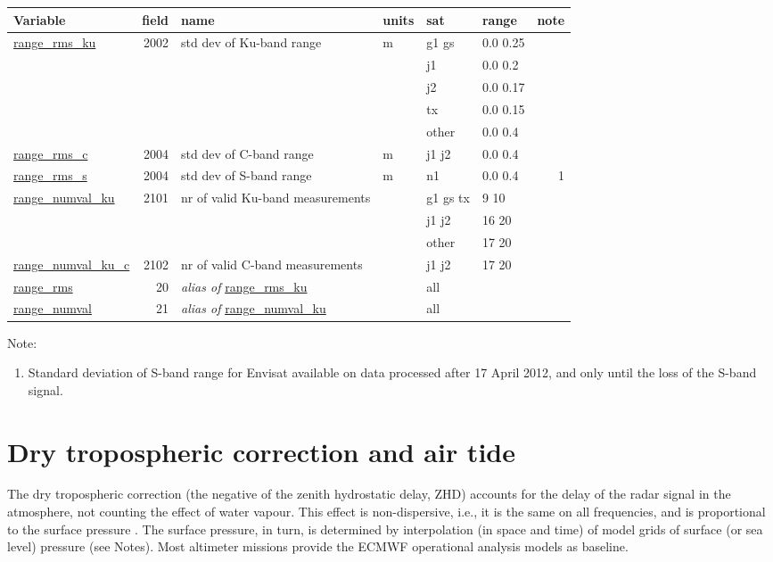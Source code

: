 \documentclass[a4paper,11pt,openany,natbib]{thesis}
\makeatletter
\newcommand\var[1]{\url{#1}\index{variables!#1@\protect\url{#1}}}
\newcommand\alias[1]{\emph{alias of} \var{#1}}
\newenvironment{vartable}{
\begin{table}[ht]
\small
\begin{tabular}{lrllllr}
\hline
Variable & field & name & units & sat & range & note \\
\hline
}{
\hline
\end{tabular}
\end{table}
}
\makeatother
\begin{document}
\begin{vartable}
\var{range_rms_ku} & 2002 & std dev of Ku-band range & m & g1 gs & 0.0 0.25 & \\
                    &      &                          &   & j1 & 0.0 0.2 & \\
                    &      &                          &   & j2 & 0.0 0.17 & \\
                    &      &                          &   & tx & 0.0 0.15 & \\
                    &      &                          &   & other & 0.0 0.4 & \\
\var{range_rms_c}  & 2004 & std dev of C-band range  & m & j1 j2 & 0.0 0.4 & \\
\var{range_rms_s}  & 2004 & std dev of S-band range  & m & n1 & 0.0 0.4 & 1 \\
\var{range_numval_ku} & 2101 & nr of valid Ku-band measurements && g1 gs tx & 9 10 & \\
                      &      &                                      && j1 j2 & 16 20 & \\
                      &      &                                      && other & 17 20 & \\
\var{range_numval_ku_c} & 2102 & nr of valid C-band measurements && j1 j2 & 17 20 & \\
\hline
\var{range_rms}    &   20 & \alias{range_rms_ku} && all && \\
\var{range_numval} &   21 & \alias{range_numval_ku} && all && \\
\end{vartable}

Note:
\begin{enumerate}
\item Standard deviation of S-band range for Envisat available on data processed after 17 April 2012, and only until the loss of the S-band signal.
\end{enumerate}

\section{Dry tropospheric correction and air tide}
\label{var:dry_tropo}
The dry tropospheric correction (the negative of the zenith hydrostatic delay, ZHD) accounts for the delay of the radar signal in the atmosphere, not counting the effect of water vapour. This effect is non-dispersive, i.e., it is the same on all frequencies, and is proportional to the surface pressure \citep{saastamoinen1972}. The surface pressure, in turn, is determined by interpolation (in space and time) of model grids of surface (or sea level) pressure (see Notes). Most altimeter missions provide the ECMWF operational analysis models as baseline.
\end{document}
